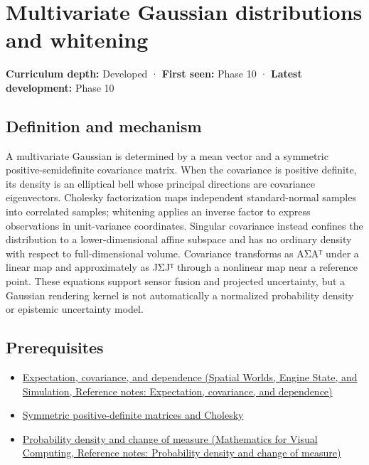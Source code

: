 \hypertarget{appendix-12bbe185dbe5}{}\label{referencestart:appendix-12bbe185dbe5}
\section{Multivariate Gaussian distributions and whitening}\label{appendix-12bbe185dbe5-multivariate-gaussian-distributions-and-whitening}

\textbf{Curriculum depth:} Developed · \textbf{First seen:} Phase 10 · \textbf{Latest development:} Phase 10

\begin{allmightroledefinition}

\subsection{Definition and mechanism}\label{appendix-12bbe185dbe5-definition-and-mechanism}

A multivariate Gaussian is determined by a mean vector and a symmetric positive-semidefinite covariance matrix. When the covariance is positive definite, its density is an elliptical bell whose principal directions are covariance eigenvectors. Cholesky factorization maps independent standard-normal samples into correlated samples; whitening applies an inverse factor to express observations in unit-variance coordinates. Singular covariance instead confines the distribution to a lower-dimensional affine subspace and has no ordinary density with respect to full-dimensional volume. Covariance transforms as AΣAᵀ under a linear map and approximately as JΣJᵀ through a nonlinear map near a reference point. These equations support sensor fusion and projected uncertainty, but a Gaussian rendering kernel is not automatically a normalized probability density or epistemic uncertainty model.

\end{allmightroledefinition}

\subsection{Prerequisites}\label{appendix-12bbe185dbe5-prerequisites}

\begin{itemize}
\tightlist
\item
  \href{../05-Spatial-Worlds-Engine-State-and-Simulation/main.pdf\#nameddest=appendix-54c383df9992}{Expectation, covariance, and dependence (Spatial Worlds, Engine State, and Simulation, Reference notes: Expectation, covariance, and dependence)}
\item
  \hyperref[appendix-50d2ea3c9b26]{Symmetric positive-definite matrices and Cholesky}
\item
  \href{../02-Mathematics-for-Visual-Computing/main.pdf\#nameddest=appendix-4815cd87ab8b}{Probability density and change of measure (Mathematics for Visual Computing, Reference notes: Probability density and change of measure)}
\end{itemize}

